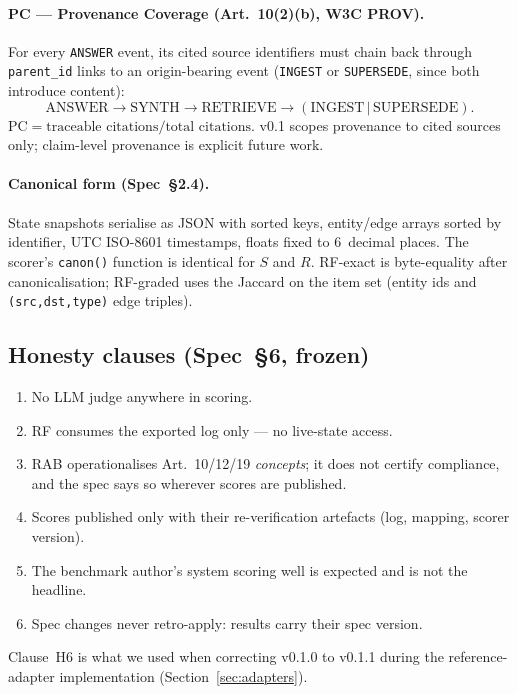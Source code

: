 \documentclass[11pt,a4paper]{article}
\begin{document}
\paragraph{PC --- Provenance Coverage (Art.~10(2)(b), W3C PROV).} For every \texttt{ANSWER} event, its cited source identifiers must chain back through \texttt{parent\_id} links to an origin-bearing event (\texttt{INGEST} or \texttt{SUPERSEDE}, since both introduce content):
\[
\mathrm{ANSWER} \to \mathrm{SYNTH} \to \mathrm{RETRIEVE} \to (\mathrm{INGEST}\,|\,\mathrm{SUPERSEDE}).
\]
$\mathrm{PC} = \text{traceable citations} / \text{total citations}$. v0.1 scopes provenance to cited sources only; claim-level provenance is explicit future work.

\paragraph{Canonical form (Spec~§2.4).} State snapshots serialise as JSON with sorted keys, entity/edge arrays sorted by identifier, UTC ISO-8601 timestamps, floats fixed to 6~decimal places. The scorer's \texttt{canon()} function is identical for $S$ and $R$. RF-exact is byte-equality after canonicalisation; RF-graded uses the Jaccard on the item set (entity ids and \texttt{(src,dst,type)} edge triples).

\subsection{Honesty clauses (Spec~§6, frozen)}
\begin{enumerate}[label=H\arabic*,leftmargin=*]
  \item No LLM judge anywhere in scoring.
  \item RF consumes the exported log only --- no live-state access.
  \item RAB operationalises Art.~10/12/19 \emph{concepts}; it does not certify compliance, and the spec says so wherever scores are published.
  \item Scores published only with their re-verification artefacts (log, mapping, scorer version).
  \item The benchmark author's system scoring well is expected and is not the headline.
  \item Spec changes never retro-apply: results carry their spec version.
\end{enumerate}
Clause~H6 is what we used when correcting v0.1.0 to v0.1.1 during the reference-adapter implementation (Section~\ref{sec:adapters}).
\end{document}
